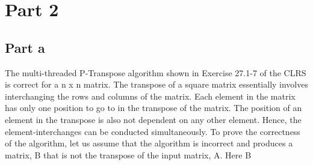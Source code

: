 \section{Part 2}
\label{sec:part2}

\subsection{Part a}

The multi-threaded P-Transpose algorithm shown in Exercise 27.1-7 of the CLRS is correct for a n x n matrix. The transpose of a square matrix essentially involves interchanging the rows and columns of the matrix. Each element in the matrix has only one position to go to in the transpose of the matrix. The position of an element in the transpose is also not dependent on any other element. Hence, the element-interchanges can be conducted simultaneously. To prove the correctness of the algorithm, let us assume that the algorithm is incorrect and produces a matrix, B that is not the transpose of the input matrix, A. Here B 